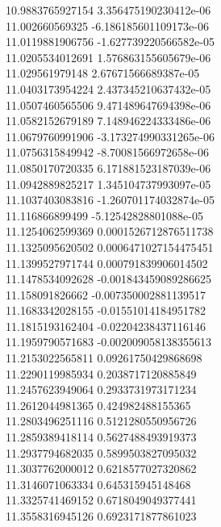 {10.9883765927154 3.356475190230412e-06 \\
11.002660569325 -6.186185601109173e-06 \\
11.0119881906756 -1.627739220566582e-05 \\
11.0205534012691 1.576863155605679e-06 \\
11.029561979148 2.67671566689387e-05 \\
11.0403173954224 2.437345210637432e-05 \\
11.0507460565506 9.471489647694398e-06 \\
11.0582152679189 7.148946224333486e-06 \\
11.0679760991906 -3.173274990331265e-06 \\
11.0756315849942 -8.70081566972658e-06 \\
11.0850170720335 6.171881523187039e-06 \\
11.0942889825217 1.345104737993097e-05 \\
11.1037403083816 -1.260701174032874e-05 \\
11.116866899499 -5.12542828801088e-05 \\
11.1254062599369 0.0001526712876511738 \\
11.1325095620502 0.0006471027154475451 \\
11.1399527971744 0.000791839906014502 \\
11.1478534092628 -0.001843459089286625 \\
11.158091826662 -0.007350002881139517 \\
11.1683342028155 -0.01551014184951782 \\
11.1815193162404 -0.02204238437116146 \\
11.1959790571683 -0.002009058138355613 \\
11.2153022565811 0.09261750429868698 \\
11.2290119985934 0.2038717120885849 \\
11.2457623949064 0.2933731973171234 \\
11.2612044981365 0.424982488155365 \\
11.2803496251116 0.5121280550956726 \\
11.2859389418114 0.5627488493919373 \\
11.2937794682035 0.5899503827095032 \\
11.3037762000012 0.6218577027320862 \\
11.3146071063334 0.645315945148468 \\
11.3325741469152 0.6718049049377441 \\
11.3558316945126 0.6923171877861023 \\
}

